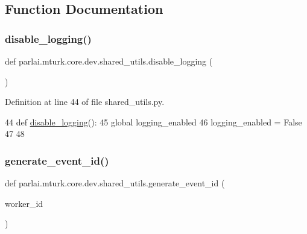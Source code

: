 \subsection{Function Documentation}
\mbox{\label{namespaceparlai_1_1mturk_1_1core_1_1dev_1_1shared__utils_aeb3b524d0d90cbea1e509a09b3dc7bf5}} 
\subsubsection{\texorpdfstring{disable\+\_\+logging()}{disable\_logging()}}
{\footnotesize\ttfamily def parlai.\+mturk.\+core.\+dev.\+shared\+\_\+utils.\+disable\+\_\+logging (\begin{DoxyParamCaption}{ }\end{DoxyParamCaption})}



Definition at line 44 of file shared\+\_\+utils.\+py.


\begin{DoxyCode}
44 \textcolor{keyword}{def }\hyperlink{namespaceparlai_1_1mturk_1_1core_1_1shared__utils_ac9c2cb4e45eb5bb480df0cd8b18c64da}{disable\_logging}():
45     \textcolor{keyword}{global} logging\_enabled
46     logging\_enabled = \textcolor{keyword}{False}
47 
48 
\end{DoxyCode}
\mbox{\label{namespaceparlai_1_1mturk_1_1core_1_1dev_1_1shared__utils_a95fa6a517a734351c159f2811d04af05}} 
\subsubsection{\texorpdfstring{generate\+\_\+event\+\_\+id()}{generate\_event\_id()}}
{\footnotesize\ttfamily def parlai.\+mturk.\+core.\+dev.\+shared\+\_\+utils.\+generate\+\_\+event\+\_\+id (\begin{DoxyParamCaption}\item[{}]{worker\+\_\+id }\end{DoxyParamCaption})}

